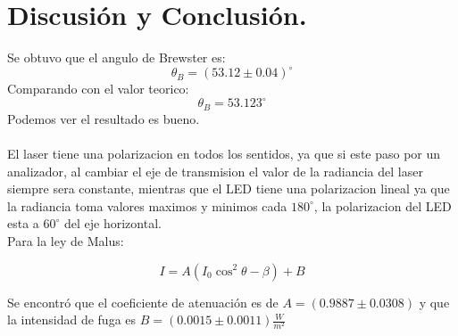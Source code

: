 \documentclass[DIV=calc, paper=a4, fontsize=10pt]{scrartcl}
\begin{document}
\section*{\textcolor{carmine}{Discusión y Conclusión.}}

Se obtuvo que el angulo de Brewster es:
\begin{equation*}
    \theta_{B}= (53.12 \pm 0.04)^{\circ}
\end{equation*}
Comparando con el valor teorico:
\begin{equation*}
    \theta_{B} = 53.123^{\circ}
\end{equation*}
Podemos ver el resultado es bueno.
\\\\
El laser tiene una polarizacion en todos los sentidos, ya que si este paso por un analizador, al cambiar el eje de transmision el valor de la radiancia del laser siempre sera constante, mientras que el LED tiene una polarizacion lineal ya que la radiancia toma valores maximos y minimos cada $180^{\circ}$, la polarizacion del LED esta a $60^{\circ}$ del eje horizontal.
\\
Para la ley de Malus:

\begin{equation*}
    I = A (I_{0}\cos^2{\theta - \beta} ) + B
\end{equation*}

Se encontró que el coeficiente de atenuación es de $A= (0.9887 \pm 0.0308)$ y que la intensidad de fuga es $B= (0.0015 \pm 0.0011) \frac{W}{m^{2}}$
\nocite{*}


\end{document}

